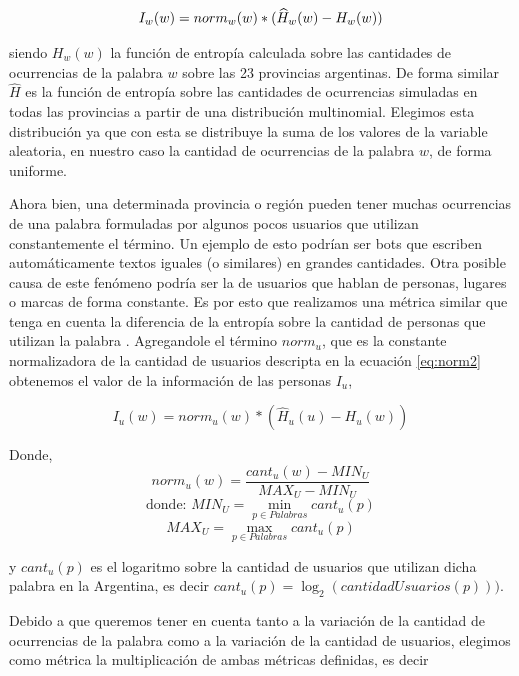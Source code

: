 \begin{equation}
I_w(w) = norm_{w}(w) * (\widehat{H}_{w}(w) - H_{w}(w)) \\
\end{equation}

siendo $H_w(w)$ la función de entropía calculada sobre las cantidades de ocurrencias de la palabra $w$ sobre las 23 provincias argentinas. De forma similar $\widehat{H}$ es la función de entropía sobre las cantidades de ocurrencias simuladas en todas las provincias a partir de una distribución multinomial. Elegimos esta distribución ya que con esta se distribuye la suma de los valores de la variable aleatoria, en nuestro caso la cantidad de ocurrencias de la palabra $w$, de forma uniforme.%

Ahora bien, una determinada provincia o región pueden tener muchas ocurrencias de una palabra formuladas por algunos pocos usuarios que utilizan constantemente el término. Un ejemplo de esto podrían ser bots que escriben automáticamente textos iguales (o similares) en grandes cantidades. Otra posible causa de este fenómeno podría ser la de usuarios que hablan de personas, lugares o marcas de forma constante.
Es por esto que realizamos una métrica similar que tenga en cuenta la diferencia de la entropía sobre la cantidad de personas que utilizan la palabra . Agregandole el término $norm_u$, que es la constante normalizadora de la cantidad de usuarios descripta en la ecuación \ref{eq:norm2} obtenemos el valor de la información de las personas $I_u$,

\begin{equation}
I_u(w) = norm_{u}(w) * (\widehat{H}_{u}(u) - H_{u}(w))
\end{equation}

Donde,
\begin{equation}
norm_{u}(w) = \frac{cant_u(w)- MIN_U }{MAX_U - MIN_U}
\label{eq:norm2}
\end{equation}
\begin{equation}
 \text{donde: } MIN_U = \min\limits_{p \in Palabras} cant_u(p)
\end{equation}
\begin{equation}
  MAX_U = \max\limits_{p \in Palabras} cant_u(p)
\end{equation}

y $cant_u(p)$ es el logaritmo sobre  la cantidad de usuarios que utilizan dicha palabra en la Argentina, es decir $cant_u(p)= \log_2(cantidadUsuarios(p)))$.

Debido a que queremos tener en cuenta tanto a la variación de la cantidad de ocurrencias de la palabra como a la variación de la cantidad de usuarios, elegimos como métrica la multiplicación de ambas métricas definidas, es decir  


